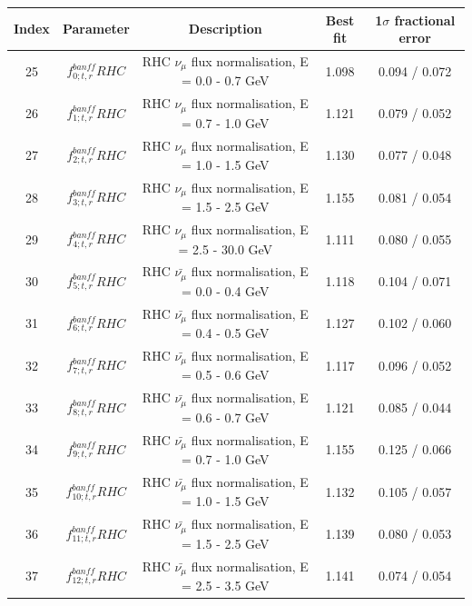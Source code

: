 {%


\begin{table}
\centering
\begin{tabular}{| c | c | c | c | c |}
\hline
         Index  &Parameter & Description & Best fit & 1$\sigma$ fractional error \\
\hline

25      &  $f_{0; t, r}^{banff} RHC$  & RHC $\nu_\mu$ flux normalisation, E = 0.0 - 0.7 GeV         & 1.098   & 0.094 / 0.072 \\ 
26      &   $f_{1; t, r}^{banff} RHC$ & RHC $\nu_\mu$ flux normalisation, E = 0.7 - 1.0 GeV         & 1.121   & 0.079 / 0.052 \\ 
27       &  $f_{2; t, r}^{banff} RHC$ & RHC $\nu_\mu$ flux normalisation, E = 1.0 - 1.5 GeV         & 1.130   & 0.077 / 0.048 \\ 
28       &  $f_{3; t, r}^{banff} RHC$ & RHC $\nu_\mu$ flux normalisation, E = 1.5 - 2.5 GeV         & 1.155   & 0.081 / 0.054 \\ 
29       &  $f_{4; t, r}^{banff} RHC$ & RHC $\nu_\mu$ flux normalisation, E = 2.5 - 30.0 GeV        & 1.111   & 0.080 / 0.055 \\ 
30       &  $f_{5; t, r}^{banff} RHC$ & RHC $\bar{\nu_\mu}$ flux normalisation, E = 0.0 - 0.4 GeV   & 1.118   & 0.104 / 0.071 \\ 
31       &  $f_{6; t, r}^{banff} RHC$ & RHC $\bar{\nu_\mu}$ flux normalisation, E = 0.4 - 0.5 GeV   & 1.127   & 0.102 / 0.060 \\ 
32       &  $f_{7; t, r}^{banff} RHC$ & RHC $\bar{\nu_\mu}$ flux normalisation, E = 0.5 - 0.6 GeV   & 1.117   & 0.096 / 0.052 \\ 
33       &  $f_{8; t, r}^{banff} RHC$ & RHC $\bar{\nu_\mu}$ flux normalisation, E = 0.6 - 0.7 GeV   & 1.121   & 0.085 / 0.044 \\ 
34       &  $f_{9; t, r}^{banff} RHC$ & RHC $\bar{\nu_\mu}$ flux normalisation, E = 0.7 - 1.0 GeV   & 1.155   & 0.125 / 0.066 \\ 
35       & $f_{10; t, r}^{banff} RHC$  & RHC $\bar{\nu_\mu}$ flux normalisation, E = 1.0 - 1.5 GeV   & 1.132   & 0.105 / 0.057 \\ 
36       & $f_{11; t, r}^{banff} RHC$  & RHC $\bar{\nu_\mu}$ flux normalisation, E = 1.5 - 2.5 GeV   & 1.139   & 0.080 / 0.053 \\ 
37       & $f_{12; t, r}^{banff} RHC$  & RHC $\bar{\nu_\mu}$ flux normalisation, E = 2.5 - 3.5 GeV   & 1.141   & 0.074 / 0.054 \\ 

\end{tabular}
\end{table}}

